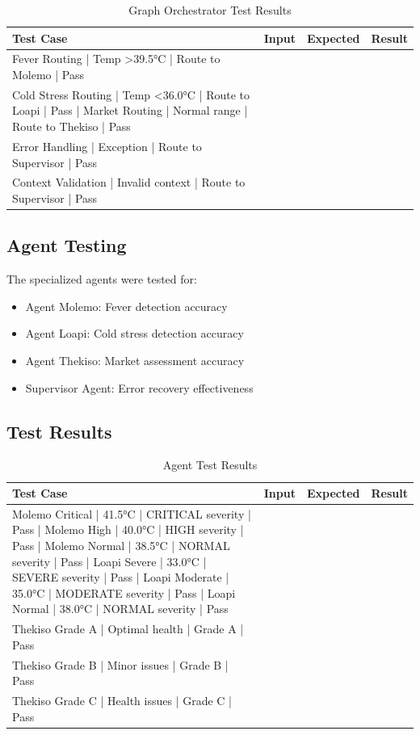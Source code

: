 \begin{table}[H]
\centering
\begin{tabular}{|l|l|l|l|}
\hline
\textbf{Test Case} & \textbf{Input} & \textbf{Expected} & \textbf{Result} \\
\hline
Fever Routing | Temp >39.5°C | Route to Molemo | Pass \\
Cold Stress Routing | Temp <36.0°C | Route to Loapi | Pass |
Market Routing | Normal range | Route to Thekiso | Pass \\
Error Handling | Exception | Route to Supervisor | Pass \\
Context Validation | Invalid context | Route to Supervisor | Pass \\
\hline
\end{tabular}
\caption{Graph Orchestrator Test Results}
\end{table}

\subsection{Agent Testing}

The specialized agents were tested for:

\begin{itemize}
    \item Agent Molemo: Fever detection accuracy
    \item Agent Loapi: Cold stress detection accuracy
    \item Agent Thekiso: Market assessment accuracy
    \item Supervisor Agent: Error recovery effectiveness
\end{itemize}

\subsection{Test Results}

\begin{table}[H]
\centering
\begin{tabular}{|l|l|l|l|}
\hline
\textbf{Test Case} & \textbf{Input} & \textbf{Expected} & \textbf{Result} \\
\hline
Molemo Critical | 41.5°C | CRITICAL severity | Pass |
Molemo High | 40.0°C | HIGH severity | Pass |
Molemo Normal | 38.5°C | NORMAL severity | Pass |
Loapi Severe | 33.0°C | SEVERE severity | Pass |
Loapi Moderate | 35.0°C | MODERATE severity | Pass |
Loapi Normal | 38.0°C | NORMAL severity | Pass \\
Thekiso Grade A | Optimal health | Grade A | Pass \\
Thekiso Grade B | Minor issues | Grade B | Pass \\
Thekiso Grade C | Health issues | Grade C | Pass \\
\hline
\end{tabular}
\caption{Agent Test Results}
\end{table}

